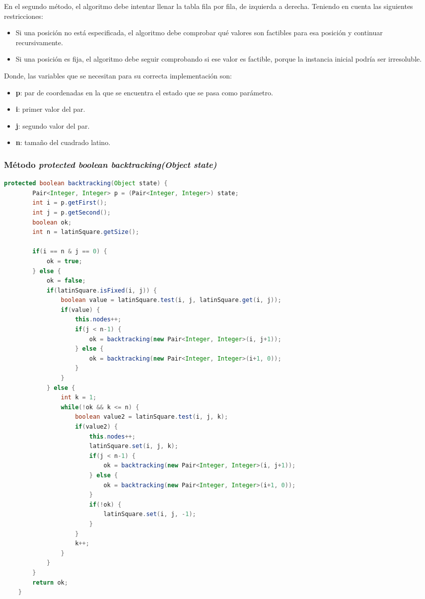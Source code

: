 \documentclass[11pt,letterpaper]{article}
\begin{document}
	
En el segundo método, el algoritmo debe intentar llenar la tabla fila por fila, de izquierda a derecha. Teniendo en cuenta las siguientes restricciones:

\begin{itemize}
	\item Si una posición no está especificada, el algoritmo debe comprobar qué valores son factibles para esa posición y continuar recursivamente.
	\item Si una posición es fija, el algoritmo debe seguir comprobando si ese valor es factible, porque la instancia inicial podría ser irresoluble.
\end{itemize}

Donde, las variables que se necesitan para su correcta implementación son:
\begin{multicols}{2}
	\begin{itemize}
		\item \textbf{p}: par de coordenadas en la que se encuentra el estado que se pasa como parámetro.
		\item \textbf{i}: primer valor del par.
		\item \textbf{j}: segundo valor del par.
		\item \textbf{n}: tamaño del cuadrado latino.
	\end{itemize}
\end{multicols}

\subsubsection{Método \textit{protected boolean backtracking(Object state)}}
\begin{lstlisting}[language = java]
	protected boolean backtracking(Object state) {
		Pair<Integer, Integer> p = (Pair<Integer, Integer>) state;
		int i = p.getFirst();
		int j = p.getSecond();
		boolean ok;
		int n = latinSquare.getSize();
		
		if(i == n & j == 0) {
			ok = true;
		} else {
			ok = false;
			if(latinSquare.isFixed(i, j)) {
				boolean value = latinSquare.test(i, j, latinSquare.get(i, j));
				if(value) {
					this.nodes++;
					if(j < n-1) {
						ok = backtracking(new Pair<Integer, Integer>(i, j+1));
					} else {
						ok = backtracking(new Pair<Integer, Integer>(i+1, 0));
					}
				}
			} else {
				int k = 1;
				while(!ok && k <= n) {
					boolean value2 = latinSquare.test(i, j, k);
					if(value2) {
						this.nodes++;
						latinSquare.set(i, j, k);
						if(j < n-1) {
							ok = backtracking(new Pair<Integer, Integer>(i, j+1));
						} else {
							ok = backtracking(new Pair<Integer, Integer>(i+1, 0));
						}
						if(!ok) {
							latinSquare.set(i, j, -1);
						}
					}
					k++;
				}
			}
		}
		return ok;
	}	
\end{lstlisting}
\end{document}

